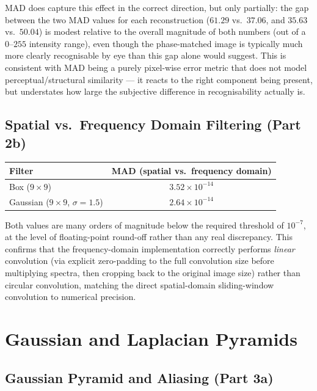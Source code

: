 \documentclass[11pt]{article}
\begin{document}
MAD does capture this effect in the correct direction, but only partially: the gap between
the two MAD values for each reconstruction ($61.29$ vs.\ $37.06$, and $35.63$ vs.\ $50.04$)
is modest relative to the overall magnitude of both numbers (out of a $0$--$255$ intensity
range), even though the phase-matched image is typically much more clearly recognisable by
eye than this gap alone would suggest. This is consistent with MAD being a purely
pixel-wise error metric that does not model perceptual/structural similarity --- it reacts
to the right component being present, but understates how large the subjective difference
in recognisability actually is.

\subsection{Spatial vs.\ Frequency Domain Filtering (Part 2b)}

\begin{center}
\begin{tabular}{lc}
\toprule
Filter & MAD (spatial vs.\ frequency domain) \\
\midrule
Box ($9\times9$) & $3.52\times10^{-14}$ \\
Gaussian ($9\times9$, $\sigma=1.5$) & $2.64\times10^{-14}$ \\
\bottomrule
\end{tabular}
\end{center}

Both values are many orders of magnitude below the required threshold of $10^{-7}$, at the
level of floating-point round-off rather than any real discrepancy. This confirms that the
frequency-domain implementation correctly performs \emph{linear} convolution (via explicit
zero-padding to the full convolution size before multiplying spectra, then cropping back to
the original image size) rather than circular convolution, matching the direct spatial-domain
sliding-window convolution to numerical precision.

\section{Gaussian and Laplacian Pyramids}

\subsection{Gaussian Pyramid and Aliasing (Part 3a)}
\end{document}
